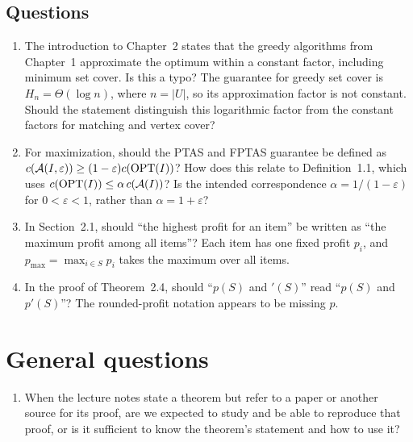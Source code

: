\documentclass[12pt,a4paper]{article}
\begin{document}
\subsection*{Questions}
\begin{enumerate}
\item The introduction to Chapter~2 states that the greedy algorithms from
Chapter~1 approximate the optimum within a constant factor, including minimum
set cover. Is this a typo? The guarantee for greedy set cover is $H_n=\Theta(\log n)$,
where $n=|U|$, so its approximation factor is not constant. Should the statement
distinguish this logarithmic factor from the constant factors for matching
and vertex cover?
\item For maximization, should the PTAS and FPTAS guarantee be defined as
$c(\mathcal A(I,\varepsilon))\geq(1-\varepsilon)c(\operatorname{OPT}(I))$?
How does this relate to Definition~1.1, which uses
$c(\operatorname{OPT}(I))\leq\alpha\,c(\mathcal A(I))$?
Is the intended correspondence $\alpha=1/(1-\varepsilon)$ for
$0<\varepsilon<1$, rather than $\alpha=1+\varepsilon$?
\item In Section~2.1, should ``the highest profit for an item'' be written as
``the maximum profit among all items''? Each item has one fixed profit $p_i$,
and $p_{\max}=\max_{i\in S}p_i$ takes the maximum over all items.
\item In the proof of Theorem~2.4, should ``$p(S)$ and $'(S)$'' read
``$p(S)$ and $p'(S)$''? The rounded-profit notation appears to be missing $p$.
\end{enumerate}

\clearpage
\section*{General questions}
\begin{enumerate}
\item When the lecture notes state a theorem but refer to a paper or another
source for its proof, are we expected to study and be able to reproduce that
proof, or is it sufficient to know the theorem's statement and how to use it?
\end{enumerate}
\end{document}
